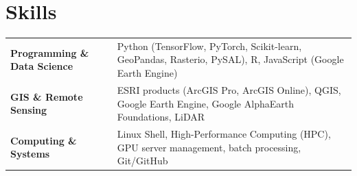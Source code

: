\documentclass[a4paper,12pt]{article}
\begin{document}
\section{Skills}
\begin{tabularx}{\linewidth}{@{}l X@{}}
\textbf{Programming \& Data Science} & 
Python (TensorFlow, PyTorch, Scikit-learn, GeoPandas, Rasterio, PySAL), R, JavaScript (Google Earth Engine) \\ [3pt]
\textbf{GIS \& Remote Sensing} & 
ESRI products (ArcGIS Pro, ArcGIS Online), QGIS, Google Earth Engine, Google AlphaEarth Foundations, LiDAR \\ [3pt]
\textbf{Computing \& Systems} & 
Linux Shell, High-Performance Computing (HPC), GPU server management, batch processing, Git/GitHub \\
\end{tabularx}

\vfill
{}
\end{document}
